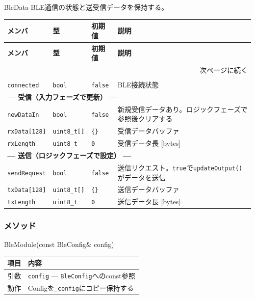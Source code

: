 \begin{funcblock}{BleData}
BLE通信の状態と送受信データを保持する。

\begin{longtable}{l l l p{3.8cm}}
\toprule
\textbf{メンバ} & \textbf{型} & \textbf{初期値} & \textbf{説明} \\
\midrule
\endfirsthead
\toprule
\textbf{メンバ} & \textbf{型} & \textbf{初期値} & \textbf{説明} \\
\midrule
\endhead
\midrule
\multicolumn{4}{r}{\small 次ページに続く} \\
\endfoot
\bottomrule
\endlastfoot
\multicolumn{4}{l}{\textbf{--- 接続状態 ---}} \\
\texttt{connected}   & \texttt{bool}    & \texttt{false} & BLE接続状態 \\
\midrule
\multicolumn{4}{l}{\textbf{--- 受信（入力フェーズで更新） ---}} \\
\texttt{newDataIn}   & \texttt{bool}    & \texttt{false} & 新規受信データあり。ロジックフェーズで参照後クリアする \\
\texttt{rxData[128]} & \texttt{uint8\_t[]} & \texttt{\{\}} & 受信データバッファ \\
\texttt{rxLength}    & \texttt{uint8\_t} & \texttt{0}    & 受信データ長 [bytes] \\
\midrule
\multicolumn{4}{l}{\textbf{--- 送信（ロジックフェーズで設定） ---}} \\
\texttt{sendRequest} & \texttt{bool}    & \texttt{false} & 送信リクエスト。\texttt{true}で\texttt{updateOutput()}がデータを送信 \\
\texttt{txData[128]} & \texttt{uint8\_t[]} & \texttt{\{\}} & 送信データバッファ \\
\texttt{txLength}    & \texttt{uint8\_t} & \texttt{0}    & 送信データ長 [bytes] \\
\end{longtable}
\end{funcblock}

\subsubsection{メソッド}

\begin{funcblock}{BleModule(const BleConfig\& config)}
\begin{tabularx}{\textwidth}{l X}
\toprule
\textbf{項目} & \textbf{内容} \\
\midrule
引数   & \texttt{config} --- \texttt{BleConfig}へのconst参照 \\
動作   & Configを\texttt{\_config}にコピー保持する \\
\bottomrule
\end{tabularx}
\end{funcblock}

